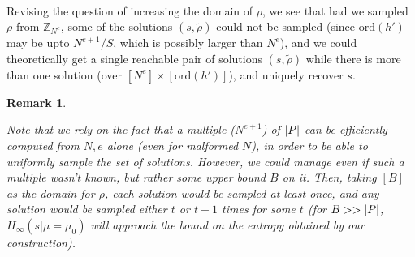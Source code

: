 \documentclass[11pt]{article}
\newtheorem{Remark}[theorem]{Remark}
\newenvironment{remark}{\begin{Remark}\begin{rm}}{\end{rm}\end{Remark}}
\newcommand{\Z}{\mathbb{Z}}
\newcommand{\ciph}{{C}}
\newcommand{\ciphtext}[1]{\ciph_{#1}}
\newcommand{\mathify}[1]{\ifmmode{#1}\else\mbox{$#1$}\fi}
\newcommand{\size}[1]{\mathify{\left| #1 \right|}}
\newcommand{\order}{{\mathrm{ord}}}
\begin{document}
\paragraph{}Revising the question of increasing the domain of $\rho$, we see that had we sampled $\rho$ from $\Z_{N^e}$, some of the solutions $(s,\tilde{\rho})$ could not be sampled (since $\order(h')$ may be upto $N^{e+1}/S$, which is possibly larger than $N^e$), and we could theoretically get a single reachable pair of solutions $(s,\tilde{\rho})$ while there is more than one solution (over $[N^e]\times[\order(h')]$), and uniquely recover $s$.
\begin{remark}%
Note that we rely on the fact that a multiple ($N^{e+1}$) of $\size{P}$ can be efficiently
computed from $N,e$ alone (even for malformed $N$), in order to be able to uniformly sample the set
of solutions. However, we could manage even if such a multiple wasn't known, but rather some upper bound
$B$ on it. Then, taking $[B]$ as the domain for $\rho$, each solution would be sampled at least once,
and any solution would be sampled either $t$ or $t+1$ times for some $t$ (for $B>>\size{P}$, $H_{\infty}(s|\mu=\mu_0)$ will approach the bound on the entropy obtained by our construction).
\end{remark}
\end{document}
